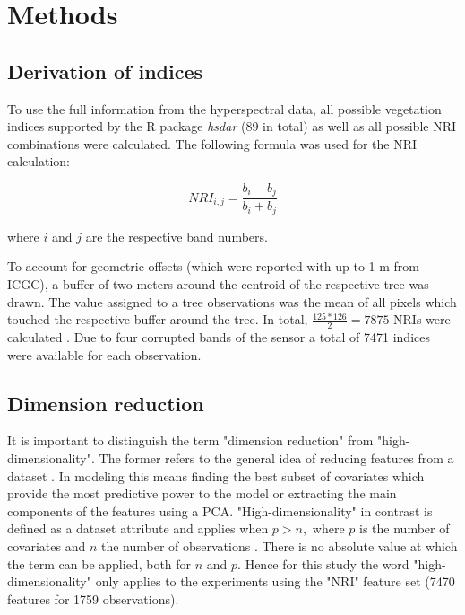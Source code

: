 \documentclass[letterpaper, journal]{IEEEtran}
\begin{document}
\section{Methods}

\subsection{Derivation of indices}
\noindent To use the full information from the hyperspectral data, all possible vegetation indices supported by the R package \textit{hsdar} (89 in total) as well as all possible \ac{NRI} combinations were calculated.
The following formula was used for the NRI calculation:

\begin{equation}
	NRI_{i,j} = \frac{b_{i} - b_{j}}{b_{i} + b_{j}}
\end{equation}

\noindent
where $i$ and $j$ are the respective band numbers.

\bigbreak

\noindent To account for geometric offsets (which were reported with up to 1 m from \ac{ICGC}), a buffer of two meters around the centroid of the respective tree was drawn.
The value assigned to a tree observations was the mean of all pixels which touched the respective buffer around the tree.
In total, $\frac{125*126}{2} = 7875$ NRIs were calculated .
Due to four corrupted bands of the sensor a total of 7471 indices were available for each observation.

\subsection{Dimension reduction}

\noindent It is important to distinguish the term "dimension reduction" from "high-dimensionality".
The former refers to the general idea of reducing features from a dataset \cite{vandermaaten2007}.
In modeling this means finding the best subset of covariates which provide the most predictive power to the model or extracting the main components of the features using a \ac{PCA}.
"High-dimensionality" in contrast is defined as a dataset attribute and applies when $p > n,$ where $p$ is the number of covariates and $n$ the number of observations \cite{hastie2001}.
There is no absolute value at which the term can be applied, both for $n$ and $p$.
Hence for this study the word "high-dimensionality" only applies to the experiments using the "NRI" feature set (7470 features for 1759 observations).
\end{document}

